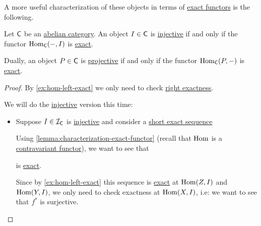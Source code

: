 \documentclass[../../main]{subfiles}
\begin{document}
A more useful characterization of these objects in terms of \hyperref[def:exact-functor]{exact functors} is the following.
\begin{proposition}\label{prop:injective-characterization-hom}
  Let \(\mathsf{C}\) be an \hyperref[def:abelian-category]{abelian category}.
  An object \(I \in \mathsf{C}\) is \hyperref[def:injective-projective-object]{injective} if and only if the functor \(\operatorname{Hom}_{\mathsf{C}}(-, I)\) is \hyperref[def:exact-functor]{exact}.

  Dually, an object \(P \in \mathsf{C}\) is \hyperref[def:injective-projective-object]{projective} if and only if the functor \(\operatorname{Hom}_{\mathsf{C}}(P, -)\) is \hyperref[def:exact-functor]{exact}.
\end{proposition}
\begin{proof}
  By \autoref{ex:hom-left-exact} we only need to check \hyperref[def:exact-functor]{right exactness}.

  We will do the \hyperref[def:injective-projective-object]{injective} version this time:
  \begin{itemize}
    \item[\(\implies\)] Suppose \(I \in \mathcal{I}_{\mathsf{C}}\) is \hyperref[def:injective-projective-object]{injective} and consider a \hyperref[def:exact-sequence]{short exact sequence}
          \begin{center}
          \end{center}
          Using \autoref{lemma:characterization-exact-functor} (recall that \(\operatorname{Hom}\) is a \hyperref[def:functor]{contravariant functor}), we want to see that
          \begin{center}
          \end{center}
          is \hyperref[def:exact-sequence]{exact}.

          Since by \autoref{ex:hom-left-exact} this sequence is \hyperref[def:exact-sequence]{exact} at \(\operatorname{Hom}(Z, I)\) and \(\operatorname{Hom}(Y, I)\), we only need to check exactness at \(\operatorname{Hom}(X, I)\), i.e: we want to see that \(f^{\ast}\) is surjective.


\end{itemize}
\end{proof}
\end{document}
